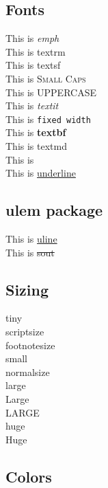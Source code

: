 \documentclass{article}
\begin{document}

  \subsection{Fonts}

  This is \emph{emph} \\
  This is \textrm{textrm} \\
  This is \textsf{textsf} \\
  This is \textsc{Small Caps} \\
  This is \uppercase{uPpeRcAsE} \\
  This is \textit{textit} \\
  This is \texttt{fixed width} \\
  This is \textbf{textbf} \\
  This is \textmd{textmd} \\
  This is  \\
  This is \underline{underline} \\

  \subsection{ulem package}

  This is \uline{uline} \\
  This is \sout{sout} \\

  \subsection{Sizing}

  {\tiny tiny} \\
  {\scriptsize scriptsize} \\
  {\footnotesize footnotesize} \\
  {\small small} \\
  {\normalsize normalsize} \\
  {\large large} \\
  {\Large Large} \\
  {\LARGE LARGE} \\
  {\huge huge} \\
  {\Huge Huge} \\

  \subsection{Colors}
\end{document}
